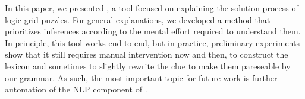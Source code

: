 
In this paper, we presented \ourtool, a tool focused on explaining the solution process of logic grid puzzles.
For general explanations, we developed a method that prioritizes inferences according to the mental effort required to understand them. 
In principle, this tool works end-to-end, but in practice, preliminary experiments show that  it still requires manual intervention now and then,  to construct the lexicon and sometimes to slightly rewrite the clue to make them pareseable by our grammar. 
As such, the most important topic for future work is further automation of the NLP component of \ourtool. 
